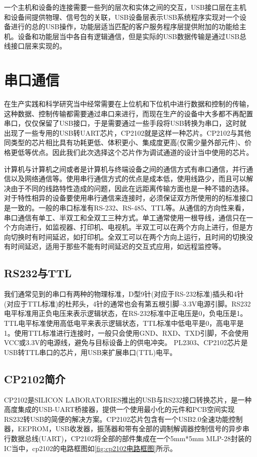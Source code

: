 	一个主机和设备的连接需要一些列的层次和实体之间的交互，USB接口层在主机和设备间提供物理、信号包的关联，USB设备层表示USB系统程序实现对一个设备进行的总的USB操作，功能层适当匹配的客户服务程序层提供附加的功能给主机。设备和功能层当中各自有逻辑通信，但是实际的USB数据传输是通过USB总线接口层来实现的\cite{USB开发手册}\cite{圈圈教你玩USB}。


\section{串口通信}
	在生产实践和科学研究当中经常需要在上位机和下位机中进行数据和控制的传输，这种数据、控制传输都需要通过串口来进行，而现在生产的设备中大多都不再配置串口，仅仅保留了USB接口，于是需要通过一些手段将USB转换为串口，这时就出现了一些专用的USB转UART芯片，CP2102就是这样一种芯片。CP2102与其他同类型的芯片相比具有功耗更低、体积更小、集成度更高(仅需少量外部元件)、价格更低等优点。因此我们此次选择这个芯片作为调试通道的设计当中使用的芯片。

	计算机与计算机之间或者是计算机与终端设备之间的通信方式有串口通信，并行通信以及网络通信等。使用串行通信方式的优点是成本低，使用线路少，而且可以解决由于不同的线路特性造成的问题，因此在远距离传输方面也是一种不错的选择。对于特性相异的设备要使用串行通信来连接时，必须保证双方所使用的的标准接口是一致的。一般的串口标准有RS-232、RS-485、TTL等。从通信的方向性来看，串口通信有单工、半双工和全双工三种方式。单工通常使用一根导线，通信只在一个方向进行，如监视器、打印机、电视机。半双工可以在两个方向上进行，但是方向切换时有时间延迟，如打印机。全双工可以在两个方向上运行，且时间的切换没有时间延迟，适用于那些不能有时间延迟的交互式应用，如远程监控等。

\subsection{RS232与TTL}
	我们通常见到的串口有两种的物理标准，D型9针(对应于RS-232标准)插头和4针(对应于TTL标准)的杜邦头，4针的通常也会有第五根引脚--3.3V电源引脚。RS232电平标准用正负电压来表示逻辑状态，在RS-232标准中正电压是0，负电压是1。TTL电平标准使用高低电平来表示逻辑状态，TTL标准中低电平是0，高电平是1。使用TTL标准进行连接时，一般只会使用GND、RXD、TXD引脚，不会使用VCC或3.3V的电源线，避免与目标设备上的供电冲突。
	PL2303、CP2102芯片是USB转TTL串口的芯片，用USB来扩展串口(TTL)电平。
	
 
\subsection{CP2102简介}
	CP2102是SILICON LABORATORIES推出的USB与RS232接口转换芯片，是一种高度集成的USB-UART桥接器，提供一个使用最小化的元件和PCB空间实现RS232转USB的简便的解决方案。CP2102芯片包含有一个USB2.0全速功能控制器，EEPROM，USB收发器，振荡器和带有全部的调制解调器控制信号的异步串行数据总线(UART)，CP2102将全部的部件集成在一个5mm*5mm MLP-28封装的IC当中\cite{CP2102}，cp2102的电路框图如\autoref{fig:cp2102电路框图}所示。

